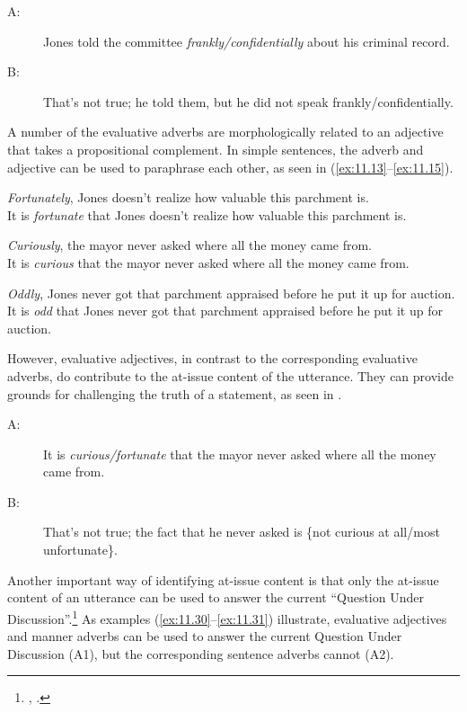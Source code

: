 \ea \label{ex:11.10}
\begin{description}
\item[A:] Jones told the committee \textit{frankly/confidentially} about his criminal record.
\item[B:] That’s not true; he told them, but he did not speak frankly/confidentially.
\end{description}
\z


A number of the evaluative adverbs are morphologically related to an adjective that takes a propositional complement. In simple sentences, the adverb and adjective can be used to paraphrase each other, as seen in (\ref{ex:11.13}--\ref{ex:11.15}).


\ea \label{ex:11.13}
\ea \textit{Fortunately}, Jones doesn’t realize how valuable this parchment is.\\
\ex It is \textit{fortunate} that Jones doesn’t realize how valuable this parchment is.
                       \z
\z

\ea \label{ex:11.14}
\ea \textit{Curiously}, the mayor never asked where all the money came from.\\
\ex It is \textit{curious} that the mayor never asked where all the money came from.
\z \z

\ea \label{ex:11.15}
\ea \textit{Oddly}, Jones never got that parchment appraised before he put it up for auction.\\
\ex It is \textit{odd} that Jones never got that parchment appraised before he put it up for auction.
                       \z
\z


However, evaluative adjectives, in contrast to the corresponding evaluative adverbs, do contribute to the at-issue content of the utterance. They can provide grounds for challenging the truth of a statement, as seen in .


\ea \label{ex:11.16}
\begin{description}
\item[A:] It is \textit{curious/fortunate} that the mayor never asked where all the money came from.\\
\item[B:] That’s not true; the fact that he never asked is \{not curious at all/most unfortunate\}.
\end{description}
\z


Another important way of identifying at-issue content is that only the at-issue content of an utterance can be used to answer the current “Question Under Discussion”.\footnote{\citet{Roberts1996}, \citet{Ginzburg1996}.}  As examples (\ref{ex:11.30}--\ref{ex:11.31}) illustrate, evaluative adjectives and manner adverbs can be used to answer the current Question Under Discussion (A1), but the corresponding sentence adverbs cannot (A2).


